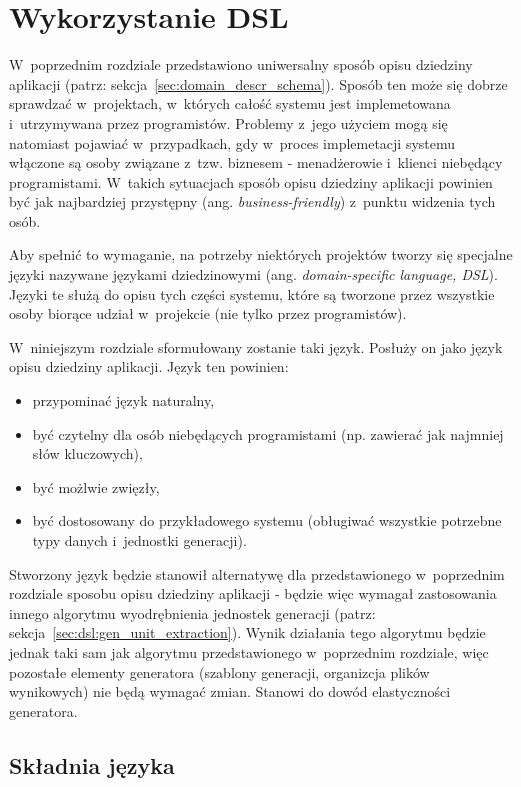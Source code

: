 \chapter{Wykorzystanie DSL}

W~poprzednim rozdziale przedstawiono uniwersalny sposób opisu dziedziny aplikacji (patrz: sekcja~\ref{sec:domain_descr_schema}).
Sposób ten może się dobrze sprawdzać w~projektach, w~których całość systemu jest implemetowana i~utrzymywana przez programistów.
Problemy z~jego użyciem mogą się natomiast pojawiać w~przypadkach, gdy w~proces implemetacji systemu włączone są osoby związane z~tzw. biznesem - menadżerowie i~klienci niebędący programistami.
W~takich sytuacjach sposób opisu dziedziny aplikacji powinien być jak najbardziej przystępny (ang. \emph{business-friendly}) z~punktu widzenia tych osób.

Aby spełnić to wymaganie, na potrzeby niektórych projektów tworzy się specjalne języki nazywane językami dziedzinowymi (ang. \emph{domain-specific language, DSL}).
Języki te służą do opisu tych części systemu, które są tworzone przez wszystkie osoby biorące udział w~projekcie (nie tylko przez programistów).

W~niniejszym rozdziale sformułowany zostanie taki język.
Posłuży on jako język opisu dziedziny aplikacji.
Język ten powinien:

\begin{itemize}
 \item przypominać język naturalny,
 \item być czytelny dla osób niebędących programistami (np. zawierać jak najmniej słów kluczowych),
 \item być możlwie zwięzły,
 \item być dostosowany do przykładowego systemu (obługiwać wszystkie potrzebne typy danych i~jednostki generacji).
\end{itemize}

Stworzony język będzie stanowił alternatywę dla przedstawionego w~poprzednim rozdziale sposobu opisu dziedziny aplikacji - będzie więc wymagał zastosowania innego algorytmu wyodrębnienia jednostek generacji (patrz: sekcja~\ref{sec:dsl:gen_unit_extraction}).
Wynik działania tego algorytmu będzie jednak taki sam jak algorytmu przedstawionego w~poprzednim rozdziale, więc pozostałe elementy generatora (szablony generacji, organizcja plików wynikowych) nie będą wymagać zmian.
Stanowi do dowód elastyczności generatora.


\section{Składnia języka}

